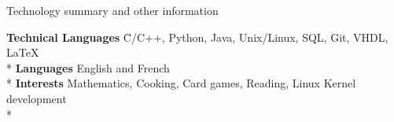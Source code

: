 \documentclass{article}
\newlength{\tabin}
\newlength{\secsep}
\newcommand{\lineunder}{\vspace*{-8pt} \\ \hspace*{-6pt} \hrulefill \\ \vspace*{-15pt}}
\newenvironment{tabbedsection}[1]{
  \begin{list}{}{
      \setlength{\itemsep}{0pt}
      \setlength{\labelsep}{0pt}
      \setlength{\labelwidth}{0pt}
      \setlength{\leftmargin}{\tabin}
      \setlength{\rightmargin}{\tabin}
      \setlength{\listparindent}{0pt}
      \setlength{\parsep}{0pt}
      \setlength{\parskip}{0pt}
      \setlength{\partopsep}{0pt}
      \setlength{\topsep}{#1}
    }
  \item[]
}{\end{list}}
\newenvironment{nospacetabbing}{
    \begin{tabbing}
}{\end{tabbing}\vspace{-1.2em}}
\newenvironment{resume_section}[1]{
  \filbreak
  \vspace{2\secsep}
  \textsc{\large#1}
  \lineunder
  \begin{tabbedsection}{\secsep}
}{\end{tabbedsection}}
\begin{document}
\begin{resume_section}{Technology summary and other information}
  \begin{nospacetabbing}

  \textbf{Technical Languages}  \= C/C++, Python, Java, Unix/Linux, SQL, Git, VHDL, \LaTeX\\*
  \textbf{Languages} \> English and French\\*
  \textbf{Interests} \> Mathematics, Cooking, Card games, Reading, Linux Kernel development\\*
  \end{nospacetabbing}
\end{resume_section}
\end{document}
